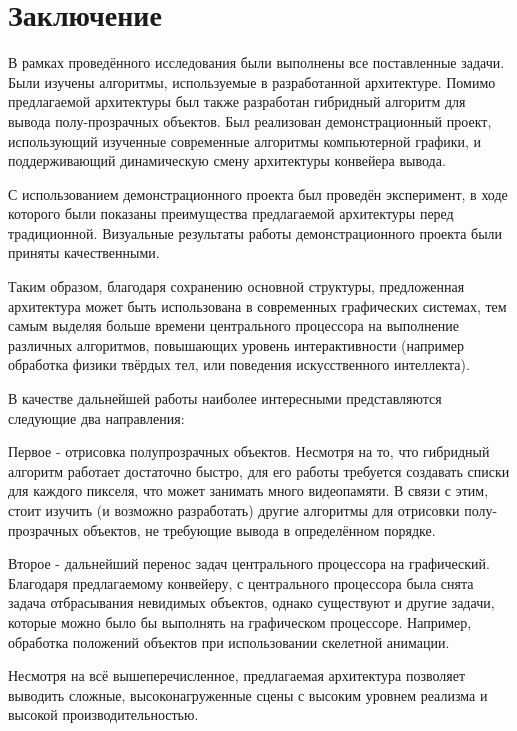 \chapter*{Заключение} \label{ch-conclusion}
	В рамках проведённого исследования были выполнены все поставленные задачи. Были изучены алгоритмы, используемые в разработанной архитектуре. Помимо предлагаемой архитектуры был также разработан гибридный алгоритм для вывода полу-прозрачных объектов. Был реализован демонстрационный проект, использующий изученные современные алгоритмы компьютерной графики, и поддерживающий динамическую смену архитектуры конвейера вывода.
	
	С использованием демонстрационного проекта был проведён эксперимент, в ходе которого были показаны преимущества предлагаемой архитектуры перед традиционной. Визуальные результаты работы демонстрационного проекта были приняты качественными.
	
	Таким образом, благодаря сохранению основной структуры, предложенная архитектура может быть использована в современных графических системах, тем самым выделяя больше времени центрального процессора на выполнение различных алгоритмов, повышающих уровень интерактивности (например обработка физики твёрдых тел, или поведения искусственного интеллекта).
	
	В качестве дальнейшей работы наиболее интересными представляются следующие два направления: 	
	
	Первое - отрисовка полупрозрачных объектов. Несмотря на то, что гибридный алгоритм работает достаточно быстро, для его работы требуется создавать списки для каждого пикселя, что может занимать много видеопамяти. В связи с этим, стоит изучить (и возможно разработать) другие алгоритмы для отрисовки полу-прозрачных объектов, не требующие вывода в определённом порядке.

	Второе - дальнейший перенос задач центрального процессора на графический. Благодаря предлагаемому конвейеру, с центрального процессора была снята задача отбрасывания невидимых объектов, однако существуют и другие задачи, которые можно было бы выполнять на графическом процессоре. Например, обработка положений объектов при использовании скелетной анимации.
	
	Несмотря на всё вышеперечисленное, предлагаемая архитектура позволяет выводить сложные, высоконагруженные сцены с высоким уровнем реализма и высокой производительностью.